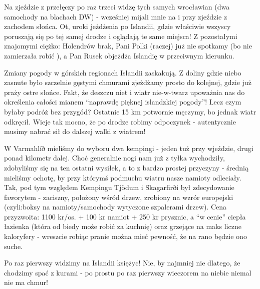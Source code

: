 Na zjeździe z przełęczy po raz trzeci widzę tych samych wrocławian (dwa samochody na blachach DW) - wcześniej mijali mnie na  i przy zjeździe z zachodem słońca. Ot, uroki jeżdżenia po Islandii, gdzie właściwie wszyscy poruszają się po tej samej drodze i oglądają te same miejsca! Z pozostałymi znajomymi ciężko: Holendrów brak, Pani Polki (raczej) już nie spotkamy (bo nie zamierzała robić ), a Pan Rusek objeżdża Islandię w przeciwnym kierunku.

Zmiany pogody w górskich regionach Islandii zaskakują. Z doliny gdzie niebo zasnute było szczelnie gęstymi chmurami zjeżdżamy prosto do kolejnej, gdzie już praży ostre słońce. Fakt, że deszczu niet i wiatr nie-w-twarz upoważnia nas do określenia całości mianem “naprawdę pięknej islandzkiej pogody”! Lecz czym byłaby podróż bez przygód? Ostatnie 15 km potwornie męczymy, bo jednak wiatr odkręcił. Wieje tak mocno, że po drodze robimy odpoczynek - autentycznie musimy nabrać sił do dalszej walki z wiatrem!

W Varmahlíð mieliśmy do wyboru dwa kempingi - jeden tuż przy wjeździe, drugi ponad kilometr dalej. Choć generalnie nogi nam już z tyłka wychodziły, zdobyliśmy się na ten ostatni wysiłek, a to z bardzo prostej przyczyny - średnią mieliśmy ochotę, by przy którymś podmuchu wiatru nasze namioty odleciały. Tak, pod tym względem Kempingu Tjödum i Skagarfirði był zdecydowanie faworytem - zaciszny, położony wśród drzew, zrobiony na wzrór europejski (czyli:boksy na namioty/samochody wytyczone szpalerami drzew). Cena przyzwoita: 1100 kr/os. + 100 kr namiot + 250 kr prysznic, a “w cenie” ciepła łazienka (która od biedy może robić za kuchnię) oraz grzejące na maks liczne kaloryfery - wreszcie robiąc pranie można mieć pewność, że na rano będzie ono suche.

Po raz pierwszy widzimy na Islandii księżyc! Nie, by najmniej nie dlatego, że chodzimy spać z kurami - po prostu po raz pierwszy wieczorem na niebie niemal nie ma chmur!
